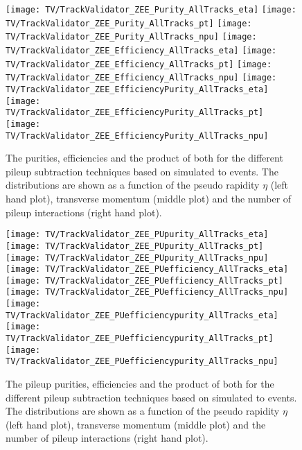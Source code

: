 \begin{figure}[h!t]
  \centering
  \texttt{[image: TV/TrackValidator\_ZEE\_Purity\_AllTracks\_eta]}
  \texttt{[image: TV/TrackValidator\_ZEE\_Purity\_AllTracks\_pt]}
  \texttt{[image: TV/TrackValidator\_ZEE\_Purity\_AllTracks\_npu]}
  \newline
  \texttt{[image: TV/TrackValidator\_ZEE\_Efficiency\_AllTracks\_eta]}
  \texttt{[image: TV/TrackValidator\_ZEE\_Efficiency\_AllTracks\_pt]}
  \texttt{[image: TV/TrackValidator\_ZEE\_Efficiency\_AllTracks\_npu]}
  \newline
  \texttt{[image: TV/TrackValidator\_ZEE\_EfficiencyPurity\_AllTracks\_eta]}
  \texttt{[image: TV/TrackValidator\_ZEE\_EfficiencyPurity\_AllTracks\_pt]}
  \texttt{[image: TV/TrackValidator\_ZEE\_EfficiencyPurity\_AllTracks\_npu]}
  \caption[Purity, efficiency and their product for the different pileup subtraction techniques based on simulated \Zz to \EE events]{The purities, efficiencies and the product of both for the different pileup subtraction techniques based on simulated \Zz to \EE events. The distributions are shown as a function of the pseudo rapidity $\eta$ (left hand plot), transverse momentum (middle plot) and the number of pileup interactions (right hand plot). \label{plot:TACOAACPZEESignal}}
\end{figure}

\begin{figure}[h!t]
  \centering
  \texttt{[image: TV/TrackValidator\_ZEE\_PUpurity\_AllTracks\_eta]}
  \texttt{[image: TV/TrackValidator\_ZEE\_PUpurity\_AllTracks\_pt]}
  \texttt{[image: TV/TrackValidator\_ZEE\_PUpurity\_AllTracks\_npu]}
  \newline
  \texttt{[image: TV/TrackValidator\_ZEE\_PUefficiency\_AllTracks\_eta]}
  \texttt{[image: TV/TrackValidator\_ZEE\_PUefficiency\_AllTracks\_pt]}
  \texttt{[image: TV/TrackValidator\_ZEE\_PUefficiency\_AllTracks\_npu]}
  \newline
  \texttt{[image: TV/TrackValidator\_ZEE\_PUefficiencypurity\_AllTracks\_eta]}
  \texttt{[image: TV/TrackValidator\_ZEE\_PUefficiencypurity\_AllTracks\_pt]}
  \texttt{[image: TV/TrackValidator\_ZEE\_PUefficiencypurity\_AllTracks\_npu]}
  \caption[Pileup purity, efficiency and their product for the different pileup subtraction techniques based on simulated \Zz to \EE events]{The pileup purities, efficiencies and the product of both for the different pileup subtraction techniques based on simulated \Zz to \EE events. The distributions are shown as a function of the pseudo rapidity $\eta$ (left hand plot), transverse momentum (middle plot) and the number of pileup interactions (right hand plot). \label{plot:TACOAACPZEEPileup}}
\end{figure}

